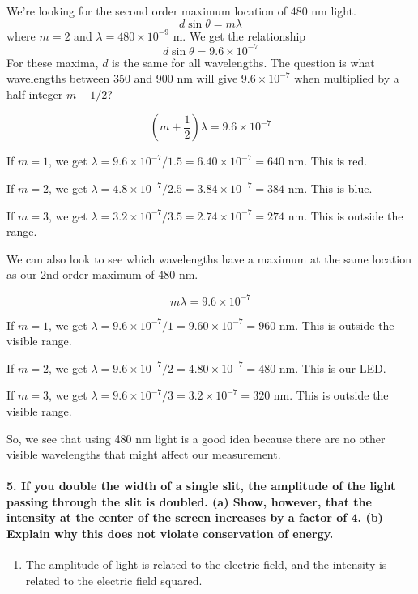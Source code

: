\documentclass[11pt]{article}
\providecommand{\tightlist}{%
      \setlength{\itemsep}{0pt}\setlength{\parskip}{0pt}}
\begin{document}
We're looking for the second order maximum location of 480 nm light.
\[d\sin\theta=m\lambda\] where \(m=2\) and \(\lambda=480\times10^{-9}\)
m. We get the relationship \[d\sin\theta=9.6\times10^{-7}\] For these
maxima, \(d\) is the same for all wavelengths. The question is what
wavelengths between 350 and 900 nm will give \(9.6\times10^{-7}\) when
multiplied by a half-integer \(m+1/2\)?

\[\left(m+\frac{1}{2}\right)\lambda = 9.6\times10^{-7}\]

If \(m=1\), we get
\(\lambda = 9.6\times10^{-7}/1.5 = 6.40\times10^{-7} = 640\) nm. This is
red.

If \(m=2\), we get
\(\lambda = 4.8\times10^{-7}/2.5 = 3.84\times10^{-7} = 384\) nm. This is
blue.

If \(m=3\), we get
\(\lambda = 3.2\times10^{-7}/3.5 = 2.74\times10^{-7} = 274\) nm. This is
outside the range.

We can also look to see which wavelengths have a maximum at the same
location as our 2nd order maximum of 480 nm.

\[m\lambda = 9.6\times10^{-7}\]

If \(m=1\), we get
\(\lambda = 9.6\times10^{-7}/1 = 9.60\times10^{-7} = 960\) nm. This is
outside the visible range.

If \(m=2\), we get
\(\lambda = 9.6\times10^{-7}/2 = 4.80\times10^{-7} = 480\) nm. This is
our LED.

If \(m=3\), we get
\(\lambda = 9.6\times10^{-7}/3 = 3.2\times10^{-7} = 320\) nm. This is
outside the visible range.

So, we see that using 480 nm light is a good idea because there are no
other visible wavelengths that might affect our measurement.

    \paragraph{5. If you double the width of a single slit, the amplitude of
the light passing through the slit is doubled. (a) Show, however, that
the intensity at the center of the screen increases by a factor of 4.
(b) Explain why this does not violate conservation of
energy.}\label{if-you-double-the-width-of-a-single-slit-the-amplitude-of-the-light-passing-through-the-slit-is-doubled.-a-show-however-that-the-intensity-at-the-center-of-the-screen-increases-by-a-factor-of-4.-b-explain-why-this-does-not-violate-conservation-of-energy.}

\begin{enumerate}
\def\labelenumi{(\alph{enumi})}
\tightlist
\item
  The amplitude of light is related to the electric field, and the
  intensity is related to the electric field squared.
\end{enumerate}
\end{document}
